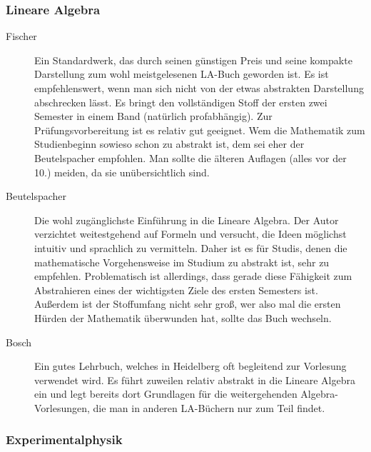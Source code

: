 \subsubsection{Lineare Algebra}
\begin{description}
\item[Fischer]{
		Ein Standardwerk, das durch seinen günstigen Preis und seine kompakte Darstellung zum wohl meistgelesenen LA-Buch geworden ist. Es ist empfehlenswert, wenn man sich nicht von der etwas abstrakten Darstellung abschrecken lässt. Es bringt den vollständigen Stoff der ersten zwei Semester in einem Band (natürlich profabhängig). Zur Prüfungsvorbereitung ist es relativ gut geeignet. Wem die Mathematik zum Studienbeginn sowieso schon zu abstrakt ist, dem sei eher der Beutelspacher empfohlen. Man sollte die älteren Auflagen (alles vor der 10.) meiden, da sie unübersichtlich sind.}

\item[Beutelspacher]{
		Die wohl zugänglichste Einführung in die Lineare Algebra. Der Autor verzichtet weitestgehend auf Formeln und versucht, die Ideen möglichst intuitiv und sprachlich zu vermitteln. Daher ist es für Studis, denen die mathematische Vorgehensweise im Studium zu abstrakt ist, sehr zu empfehlen. Problematisch ist allerdings, dass gerade diese Fähigkeit zum Abstrahieren eines der wichtigsten Ziele des ersten Semesters ist. Außerdem ist der Stoffumfang nicht sehr groß, wer also mal die ersten Hürden der Mathematik überwunden hat, sollte das Buch wechseln.}

\item[Bosch]{
		Ein gutes Lehrbuch, welches in Heidelberg oft begleitend zur Vorlesung verwendet wird. Es führt zuweilen relativ abstrakt in die Lineare Algebra ein und legt bereits dort Grundlagen für die weitergehenden Algebra-Vorlesungen, die man in anderen LA-Büchern nur zum Teil findet.}
\end{description}

\vspace{-1mm}

\subsubsection{Experimentalphysik}

